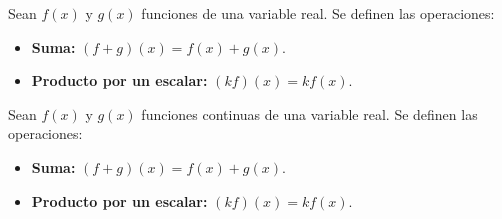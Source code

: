 \begin{example}
Sean $f(x)$ y $g(x)$ funciones de una variable real. Se definen las operaciones:
\begin{itemize}
\item \textbf{Suma:} $(f+g)(x)=f(x)+g(x)$.
\item \textbf{Producto por un escalar:} $(kf)(x)=kf(x)$.
\end{itemize} 
\end{example}

\begin{example}
Sean $f(x)$ y $g(x)$ funciones continuas de una variable real. Se definen las operaciones:
\begin{itemize}
\item \textbf{Suma:} $(f+g)(x)=f(x)+g(x)$.
\item \textbf{Producto por un escalar:} $(kf)(x)=kf(x)$.
\end{itemize} 
\end{example}

